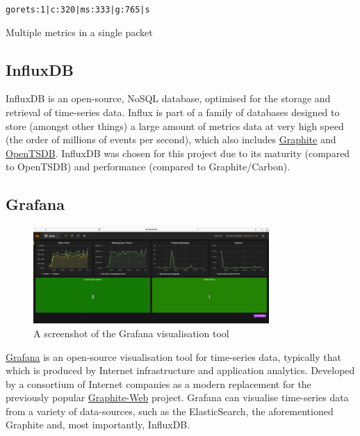 \begin{listing}
  \centering
  \texttt{gorets:1|c\nglork:320|ms\ngaugor:333|g\nuniques:765|s}
  \caption{Multiple metrics in a single packet}
  \label{lst:statsdMultiplePackets}
\end{listing}

\subsection{InfluxDB}
\label{sub:InfluxDB}

InfluxDB is an open-source, NoSQL database, optimised for the storage and
retrieval of \gls{time-series data}. Influx is part of a family of databases
designed to store (amongst other things) a large amount of metrics data at very
high speed (the order of millions of events per second), which also includes
\href{http://graphite.wikidot.com/}{Graphite} and
\href{http://opentsdb.net/}{OpenTSDB}. InfluxDB was chosen for this project due
to its maturity (compared to OpenTSDB) and performance (compared to
Graphite/Carbon).

\subsection{Grafana}
\label{sub:Grafana}

\begin{figure}[H]
  \centering
  \includegraphics[width=0.8\textwidth]{figures/grafanaMidBenchmark}
  \caption{A screenshot of the Grafana visualisation tool}
  \label{fig:grafanaMidBenchmark}
\end{figure}

\href{http://grafana.org/}{Grafana} is an open-source visualisation tool for
\gls{time-series data}, typically that which is produced by Internet
infrastructure and application analytics. Developed by a consortium of Internet
companies as a modern replacement for the previously popular
\href{https://github.com/graphite-project/graphite-web}{Graphite-Web} project.
Grafana can visualise \gls{time-series data} from a variety of data-sources,
such as the ElasticSearch, the aforementioned Graphite and, most importantly,
InfluxDB.

